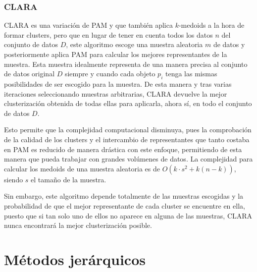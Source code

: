 \documentclass[10pt, a4paper]{article}
\begin{document}


\subsubsection{\textbf{CLARA}}

CLARA es una variación de PAM y que también aplica $k$-medoids a la hora de formar clusters, pero que en lugar de tener en cuenta todos los datos $n$ del conjunto de datos $D$, este algoritmo escoge una muestra aleatoria $m$ de datos y posteriormente aplica PAM para calcular los mejores representantes de la muestra. Esta muestra idealmente representa de una manera precisa al conjunto de datos original $D$ siempre y cuando cada objeto $p_i$ tenga las mismas posibilidades de ser escogido para la muestra. De esta manera y tras varias iteraciones seleccionando muestras arbitrarias, CLARA devuelve la mejor clusterización obtenida de todas ellas para aplicarla, ahora sí, en todo el conjunto de datos $D$.

Esto permite que la complejidad computacional disminuya, pues la comprobación de la calidad de los clusters y el intercambio de representantes que tanto costaba en PAM es reducido de manera drástica con este enfoque, permitiendo de esta manera que pueda trabajar con grandes volúmenes de datos. La complejidad para calcular los medoids de una muestra aleatoria es de $O\left(k\cdot s^2 + k\left(n - k \right)\right)$, siendo $s$ el tamaño de la muestra.

Sin embargo, este algoritmo depende totalmente de las muestras escogidas y la probabilidad de que el mejor representante de cada cluster se encuentre en ella, puesto que si tan solo uno de ellos no aparece en alguna de las muestras, CLARA nunca encontrará la mejor clusterización posible. 




\section{Métodos jerárquicos} \label{sec:Métodos jerárquicos}
\end{document}
